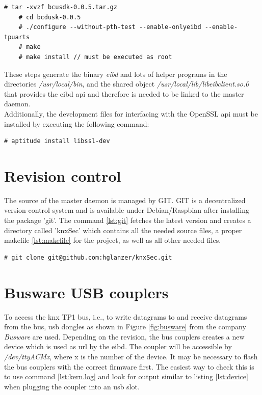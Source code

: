 \begin{lstlisting}[style=BashInputStyle]
    # tar -xvzf bcusdk-0.0.5.tar.gz
    # cd bcdusk-0.0.5
    # ./configure --without-pth-test --enable-onlyeibd --enable-tpuarts
    # make
    # make install // must be executed as root
\end{lstlisting}
These steps generate the binary \textit{eibd} and lots of helper programs in the directories \textit{/usr/local/bin}, and the shared object
\textit{/usr/local/lib/libeibclient.so.0} that provides the \gls{eibd} \gls{api} and therefore is needed to be linked to the master daemon.
\\
Additionally, the development files for interfacing with the OpenSSL \gls{api} must be installed by executing the following command:
\begin{lstlisting}[style=BashInputStyle]
 # aptitude install libssl-dev
\end{lstlisting}

\section{Revision control}

The source of the master daemon is managed by GIT. GIT is a decentralized version-control system and is available under Debian/Raspbian after installing
the package 'git'. The command \ref{lst:git} fetches the latest version and creates a directory called 'knxSec' which contains all the needed source files,
a proper makefile \ref{lst:makefile} for the project, as well as all other needed files.

\begin{lstlisting}[style=BashInputStyle,label=lst:git]
    # git clone git@github.com:hglanzer/knxSec.git
\end{lstlisting}

\section{Busware USB couplers}

To access the \gls{knx} TP1 bus, i.e., to write datagrams to and receive datagrams from the bus, \gls{usb} dongles as shown in Figure \ref{fig:busware}
from the company \textit{Busware} are used. Depending on the revision, the bus couplers creates a new device which is used as \gls{url} by the \gls{eibd}.
The coupler will be accessible by \textit{/dev/ttyACMx}, where x is the number of the device. It may be necessary to flash the bus couplers with the correct
firmware first. The easiest way to check this is to use command \ref{lst:kern.log} and look for output similar to listing \ref{lst:device} when plugging 
the coupler into an \gls{usb} slot.

